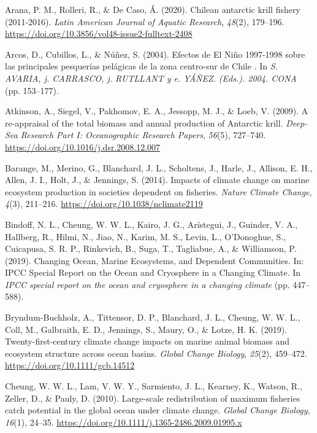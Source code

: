 \documentclass[
]{article}
\newlength{\cslhangindent}
\newenvironment{cslreferences}%
  {\setlength{\parindent}{0pt}%
  \everypar{\setlength{\hangindent}{\cslhangindent}}\ignorespaces}%
  {\par}
\begin{document}
\hypertarget{refs}{}
\begin{cslreferences}
\leavevmode\hypertarget{ref-Arana2020b}{}%
Arana, P. M., Rolleri, R., \& De Caso, Á. (2020). Chilean antarctic
krill fishery (2011-2016). \emph{Latin American Journal of Aquatic
Research}, \emph{48}(2), 179--196.
\url{https://doi.org/10.3856/vol48-issue2-fulltext-2408}

\leavevmode\hypertarget{ref-Arcos2004}{}%
Arcos, D., Cubillos, L., \& Núñez, S. (2004). Efectos de El Niño
1997-1998 sobre las principales pesquerías pelágicas de la zona
centro-sur de Chile . In \emph{S. AVARIA, j. CARRASCO, j. RUTLLANT y e.
YÁÑEZ. (Eds.). 2004. CONA} (pp. 153--177).

\leavevmode\hypertarget{ref-Atkinson2009}{}%
Atkinson, A., Siegel, V., Pakhomov, E. A., Jessopp, M. J., \& Loeb, V.
(2009). A re-appraisal of the total biomass and annual production of
Antarctic krill. \emph{Deep-Sea Research Part I: Oceanographic Research
Papers}, \emph{56}(5), 727--740.
\url{https://doi.org/10.1016/j.dsr.2008.12.007}

\leavevmode\hypertarget{ref-Barange2014}{}%
Barange, M., Merino, G., Blanchard, J. L., Scholtens, J., Harle, J.,
Allison, E. H., Allen, J. I., Holt, J., \& Jennings, S. (2014). Impacts
of climate change on marine ecosystem production in societies dependent
on fisheries. \emph{Nature Climate Change}, \emph{4}(3), 211--216.
\url{https://doi.org/10.1038/nclimate2119}

\leavevmode\hypertarget{ref-Bindoff2019}{}%
Bindoff, N. L., Cheung, W. W. L., Kairo, J. G., Arístegui, J., Guinder,
V. A., Hallberg, R., Hilmi, N., Jiao, N., Karim, M. S., Levin, L.,
O'Donoghue, S., Cuicapusa, S. R. P., Rinkevich, B., Suga, T., Tagliabue,
A., \& Williamson, P. (2019). Changing Ocean, Marine Ecosystems, and
Dependent Communities. In: IPCC Special Report on the Ocean and
Cryosphere in a Changing Climate. In \emph{IPCC special report on the
ocean and cryosphere in a changing climate} (pp. 447--588).

\leavevmode\hypertarget{ref-Bryndum-Buchholz2019}{}%
Bryndum-Buchholz, A., Tittensor, D. P., Blanchard, J. L., Cheung, W. W.
L., Coll, M., Galbraith, E. D., Jennings, S., Maury, O., \& Lotze, H. K.
(2019). Twenty-first-century climate change impacts on marine animal
biomass and ecosystem structure across ocean basins. \emph{Global Change
Biology}, \emph{25}(2), 459--472.
\url{https://doi.org/10.1111/gcb.14512}

\leavevmode\hypertarget{ref-Cheung2010a}{}%
Cheung, W. W. L., Lam, V. W. Y., Sarmiento, J. L., Kearney, K., Watson,
R., Zeller, D., \& Pauly, D. (2010). Large-scale redistribution of
maximum fisheries catch potential in the global ocean under climate
change. \emph{Global Change Biology}, \emph{16}(1), 24--35.
\url{https://doi.org/10.1111/j.1365-2486.2009.01995.x}


\end{cslreferences}
\end{document}

